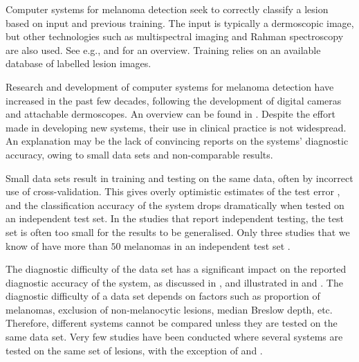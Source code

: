 \documentclass[a4paper,12pt]{article}
\begin{document}
Computer systems for melanoma detection seek to correctly classify a lesion based on input and previous training. 
The input is typically a dermoscopic image, but other technologies such as multispectral imaging and Rahman spectroscopy are also used. 
See e.g., \cite{Fink2016Noninvasive} and \cite{Masood2013Computer} for an overview. 
Training relies on an available database of labelled lesion images. 

Research and development of computer systems for melanoma detection have increased in the past few decades, following the development of digital cameras and attachable dermoscopes. 
An overview can be found in \cite{Korotkov2012Computerized}. 
Despite the effort made in developing new systems, their use in clinical practice is not widespread. 
An explanation may be the lack of convincing reports on the systems' diagnostic accuracy, owing to small data sets and non-comparable results. 

Small data sets result in training and testing on the same data, often by incorrect use of cross-validation. 
This gives overly optimistic estimates of the test error \citep{Smialowski2010Pitfalls,Hastie2009Elements}, and the classification accuracy of the system drops dramatically when tested on an independent test set. 
In the studies that report independent testing, the test set is often too small for the results to be generalised. 
Only three studies that we know of have more than $50$ melanomas in an independent test set \citep{Monheit2011Performance, Malvehy2014Clinical, Esteva2017Dermatologistlevel}. 

The diagnostic difficulty of the data set has a significant impact on the reported diagnostic accuracy of the system, as discussed in \cite{Rosado2003Accuracy}, and illustrated in \cite{Malvehy2014Clinical} and \cite{Mollersen2015Computeraided}. 
The diagnostic difficulty of a data set depends on factors such as proportion of melanomas, exclusion of non-melanocytic lesions, median Breslow depth, etc. 
Therefore, different systems cannot be compared unless they are tested on the same data set. 
Very few studies have been conducted where several systems are tested on the same set of lesions, with the exception of \cite{Perrinaud2007Can} and \cite{Mollersen2015Computeraided}. 
\end{document}
